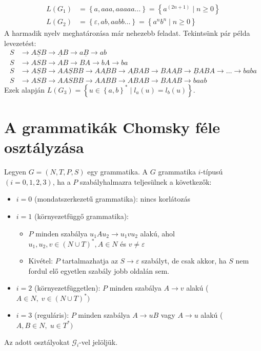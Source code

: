 \documentclass[a4paper,12pt]{article}
\theoremstyle{definition}
\begin{document}
	\begin{solution}
		\begin{align*}
			L(G_1) &= \left\lbrace a, aaa, aaaaa \dots \right\rbrace = \left\lbrace a^{(2n+1)} \; | \; n \ge 0 \right\rbrace \\
			L(G_2) &= \left\lbrace \varepsilon, ab, aabb \dots \right\rbrace = \left\lbrace a^nb^n \; | \; n \ge 0 \right\rbrace
		\end{align*}
		A harmadik nyelv meghatározása már nehezebb feladat. Tekintsünk pár példa levezetést:
		\begin{align*}
			S &\rightarrow A\underline{S}B \rightarrow \underline{A}B \rightarrow a\underline{B} \rightarrow ab \\
			S &\rightarrow ASB \rightarrow AB \rightarrow BA \rightarrow bA \rightarrow ba \\
			S &\rightarrow A\underline{S}B \rightarrow AA\underline{S}BB \rightarrow A\underline{AB}B \rightarrow \underline{AB}AB \rightarrow BA\underline{AB} \rightarrow \underline{B}ABA \rightarrow \dots \rightarrow baba \\
			S &\rightarrow ASB \rightarrow AASBB \rightarrow AABB \rightarrow ABAB \rightarrow BAAB \rightarrow baab
		\end{align*}
		Ezek alapján $L(G_3) = \left\lbrace u \in \left\lbrace a,b \right\rbrace^* \; | \; l_a(u) = l_b(u) \right\rbrace $.
	\end{solution}

	\section{A grammatikák Chomsky féle osztályzása}
	Legyen $ G = (N, T, P, S) $ egy grammatika. A $G$ grammatika $i$-típusú $ (i = 0,1,2,3) $, ha a $P$ szabályhalmazra teljesülnek a következők:
	\begin{itemize}
		\item $ i = 0 $ (mondatszerkezetű grammatika): nincs korlátozás
		\item { $ i = 1 $ (környezetfüggő grammatika):
			\begin{itemize}
				\item $P$ minden szabálya $u_1Au_2 \rightarrow u_1vu_2 $ alakú, ahol $u_1, u_2, v \in (N \cup T)^*, A \in N $ és $ v \ne \varepsilon $
				\item Kivétel: $P$ tartalmazhatja az $ S \rightarrow \varepsilon $ szabályt, de csak akkor, ha $S$ nem fordul elő egyetlen szabály jobb oldalán sem.
			\end{itemize}
		}
		\item { $ i = 2 $ (környezetfüggetlen): $ P $ minden szabálya $A \rightarrow v $ alakú ($A \in N, \; v \in (N \cup T)^*) $
		}
		\item { $ i = 3 $ (reguláris): $ P $ minden szabálya $A \rightarrow uB $ vagy $A \rightarrow u $ alakú ($A,B \in N, \; u \in T^*) $
		}
	\end{itemize}
	Az adott osztályokat $\mathcal{G}_i$-vel jelöljük.
	
\end{document}
